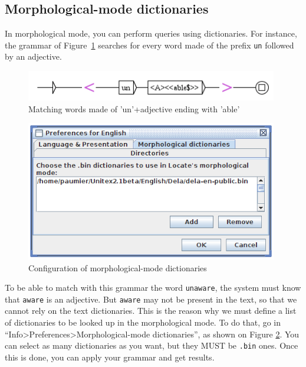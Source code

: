 \subsection{Morphological-mode dictionaries}
\label{morph-mode-dic}
In morphological mode, you can perform queries using dictionaries. For instance,  the grammar
of Figure~\ref{fig-morpho3} searches for every word made of the prefix \verb+un+ followed
by an adjective.

\begin{figure}[!ht]
\begin{center}
\includegraphics[width=11cm]{resources/img/fig6-17m.png}
\caption{Matching words made of 'un'+adjective ending with
'able'\label{fig-morpho3}}
\end{center}
\end{figure}

\begin{figure}[!ht]
\begin{center}
\includegraphics[width=11cm]{resources/img/fig6-17n.png}
\caption{Configuration of morphological-mode dictionaries\label{fig-morpho4}}
\end{center}
\end{figure}

\bigskip
\noindent To be able to match with this grammar the word 
\verb+unaware+, the system must know that \verb+aware+ is an adjective. But
\verb+aware+ may not be present in the text, so that we cannot rely on the text
dictionaries. This is the reason why we must define a list of dictionaries
to be looked up in the morphological mode. To do that, go in
``Info>Preferences>Morphological-mode dictionaries'', as shown on Figure
\ref{fig-morpho4}. You can select as many dictionaries as you want, but they
MUST be \verb+.bin+ ones. Once this is done, you can apply your grammar and get results.

